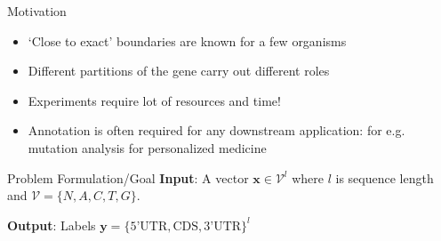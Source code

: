 \documentclass[11pt]{beamer}
\begin{document}
\begin{frame}{Motivation}
\begin{itemize}
\item `Close to exact' boundaries are known for a few organisms
\item Different partitions of the gene carry out different roles
\item Experiments require lot of resources and time!
\item Annotation is often required for any downstream application: for e.g. mutation analysis for personalized medicine
\end{itemize}
\end{frame}


\begin{frame}{Problem Formulation/Goal}
\textbf{Input}: A vector $\mathbf{x} \in \mathcal{V}^l$ where $l$ is sequence length  and $\mathcal{V} = \{N, A, C, T, G \}$. 

\textbf{Output}: Labels $\mathbf{y} = \{ \text{5'UTR}, \text{CDS}, \text{3'UTR} \}^l$

\end{frame}

\end{document}
